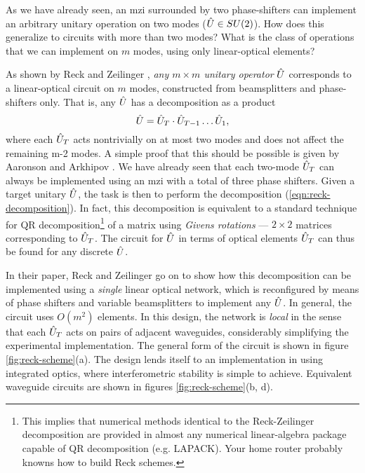 As we have already seen, an \gls{mzi} surrounded by two phase-shifters can implement an arbitrary unitary operation on two modes ($\hat{U} \in SU(2)$).  
How does this generalize to circuits with more than two modes? What is the class of operations that we can implement on $m$ modes, using only linear-optical elements?

As shown by Reck and Zeilinger \cite{Reck1994}, \emph{any $m \times m$ unitary operator} $\hat{U}$ corresponds to a linear-optical circuit on $m$ modes, constructed from beamsplitters and phase-shifters only. That is, any $\hat{U}$ has a decomposition as a product 
\begin{equation}
    \hat{U} = \hat{U}_T \cdot \hat{U}_{T-1} \ldots \hat{U}_1,
\label{eqn:reck-decomposition}
\end{equation}
where each $\hat{U}_T$ acts nontrivially on at most two modes and does not affect the remaining m-2 modes.  A simple proof that this should be possible is given by Aaronson and Arkhipov \cite{Aaronson2010a}.  We have already seen that each two-mode $\hat{U}_T$ can always be implemented using an \gls{mzi} with a total of three phase shifters. Given a target unitary $\hat{U}$, the task is then to perform the decomposition (\ref{eqn:reck-decomposition}).  In fact, this decomposition is equivalent to a standard technique for QR decomposition\footnote{This implies that numerical methods identical to the Reck-Zeilinger decomposition are provided in almost any numerical linear-algebra package capable of QR decomposition (e.g. LAPACK). Your home router probably knowns how to build Reck schemes.}
of a matrix using \emph{Givens rotations} --- $2\times2$ matrices corresponding to $\hat{U}_T$. The circuit for $\hat{U}$ in terms of optical elements $\hat{U}_T$ can thus be found for any discrete $\hat{U}$.

In their paper, Reck and Zeilinger go on to show how this decomposition can be implemented using a \emph{single} linear optical network, which is reconfigured by means of phase shifters and variable beamsplitters to implement any $\hat{U}$.  In general, the circuit uses $O(m^2)$ elements. In this design, the network is \emph{local} in the sense that each $\hat{U}_T$ acts on pairs of adjacent waveguides, considerably simplifying the experimental implementation. The general form of the circuit is shown in figure \ref{fig:reck-scheme}(a). The design lends itself to an implementation in using integrated optics, where interferometric stability is simple to achieve. Equivalent waveguide circuits are shown in figures \ref{fig:reck-scheme}(b, d). 

